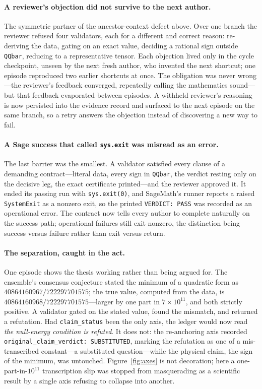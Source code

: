 \documentclass[11pt,a4paper]{article}
\newcommand{\code}[1]{\texttt{\small #1}}
\begin{document}
\paragraph{A reviewer's objection did not survive to the next author.} The
symmetric partner of the ancestor-context defect above. Over one branch the
reviewer refused four validators, each for a different and correct reason:
re-deriving the data, gating on an exact value, deciding a rational sign outside
\code{QQbar}, reducing to a representative tensor. Each objection lived only in
the cycle checkpoint, unseen by the next fresh author, who invented the next
shortcut; one episode reproduced two earlier shortcuts at once. The obligation
was never wrong---the reviewer's feedback converged, repeatedly calling the
mathematics sound---but that feedback evaporated between episodes. A withheld
reviewer's reasoning is now persisted into the evidence record and surfaced to
the next episode on the same branch, so a retry answers the objection instead of
discovering a new way to fail.

\paragraph{A Sage success that called \code{sys.exit} was misread as an error.}
The last barrier was the smallest. A validator satisfied every clause of a
demanding contract---literal data, every sign in \code{QQbar}, the verdict
resting only on the decisive leg, the exact certificate printed---and the reviewer
approved it. It ended its passing run with \code{sys.exit(0)}, and SageMath's
runner reports a raised \code{SystemExit} as a nonzero exit, so the printed
\code{VERDICT: PASS} was recorded as an operational error. The contract now tells
every author to complete naturally on the success path; operational failures
still exit nonzero, the distinction being success versus failure rather than exit
versus return.

\paragraph{The separation, caught in the act.} One episode shows the thesis
working rather than being argued for. The ensemble's consensus conjecture stated
the minimum of a quadratic form as $40864160967/722297701575$; the true value,
computed from the data, is $40864160968/722297701575$---larger by one part in
$7\times10^{11}$, and both strictly positive. A validator gated on the stated
value, found the mismatch, and returned a refutation. Had \code{claim\_status}
been the only axis, the ledger would now read \emph{the null-energy condition is
refuted}. It does not: the re-anchoring axis recorded
\code{original\_claim\_verdict: SUBSTITUTED}, marking the refutation as one of a
mis-transcribed constant---a substituted question---while the physical claim, the
sign of the minimum, was untouched. Figure~\ref{fig:axes} is not decoration; here
a one-part-in-$10^{11}$ transcription slip was stopped from masquerading as a
scientific result by a single axis refusing to collapse into another.
\end{document}

